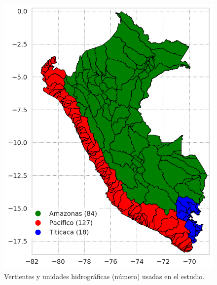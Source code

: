 \vspace{.25cm}
\begin{figure}[htb!]
\centering
	\includegraphics[scale=1]{Images/00_vertientes.png}
	\caption{Vertientes y unidades hidrográficas (número) usadas en el estudio.}
	\label{fig:00_vertientes}
\end{figure}